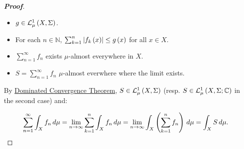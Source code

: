 \begin{proposition}
\begin{proof}[\rm\textbf{Proof}]
    \begin{itemize}
      \item $g\in\mathcal{L}^1_{\mu}\left(X,\Sigma\right)$.
      \item For each $n\in\mathbb{N}$, $\sum_{k=1}^{n}{\left|f_k\left(x\right)\right|}\leq g\left(x\right)$ for all $x\in X$.
      \item $\sum_{n=1}^{\infty}{f_n}$ exists $\mu$-almost everywhere in $X$.
      \item $S=\sum_{n=1}^{\infty}{f_n}$ $\mu$-almost everwhere where the limit exists.
    \end{itemize}

    By \hyperref[Dominated Convergence Theorem]{Dominated Convergence Theorem}, $S\in\mathcal{L}^1_{\mu}\left(X,\Sigma\right)$ (resp. $S\in\mathcal{L}^1_{\mu}\left(X,\Sigma;\mathbb{C}\right)$ in the second case) and:

    \begin{equation}
      \sum_{n=1}^{\infty}{\int_{X}{f_n\,d\mu}}=\lim_{n\to\infty}{\sum_{k=1}^{n}{\int_{X}{f_n\,d\mu}}}=\lim_{n\to\infty}{\int_{X}{\left(\sum_{k=1}^{n}{f_n}\right)\,d\mu}}=\int_{X}{S\,d\mu}.
    \end{equation}
  \end{proof}
\end{proposition}